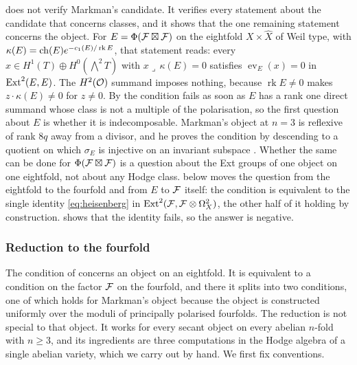 \begin{remark}\label{rem:onecondition}
 does not verify Markman's candidate. It verifies every
statement about the candidate that concerns classes, and it shows that the
one remaining statement concerns the object. For
$E=\Phi(\mathcal{F}\boxtimes\mathcal{F})$ on the eightfold $X\times\widehat X$ of Weil type,
with $\kappa(E)=\operatorname{ch}(E)e^{-c_{1}(E)/\operatorname{rk}E}$, that statement reads:
every $x\in H^{1}(T)\oplus H^{0}(\bigwedge^{2}T)$ with
$x\lrcorner\,\kappa(E)=0$ satisfies $\operatorname{ev}_{E}(x)=0$ in
$\operatorname{Ext}^{2}(E,E)$. The $H^{2}(\mathcal{O})$ summand imposes nothing, because
$\operatorname{rk}E\ne0$ makes $z\cdot\kappa(E)\ne0$ for $z\ne0$. By
\cite[Theorem~9.20]{paperI} the condition fails as soon as $E$ has a rank one
direct summand whose class is not a multiple of the polarisation, so the
first question about $E$ is whether it is indecomposable. Markman's object
at $n=3$ is reflexive of rank $8q$ away from a divisor, and he proves the
condition by descending to a quotient on which $\sigma_{E}$ is injective on
an invariant subspace \cite[Proposition 11.5]{Mar25b}. Whether the same can
be done for $\Phi(\mathcal{F}\boxtimes\mathcal{F})$ is a question about the Ext groups of one
object on one eightfold, not about any Hodge class.  below
moves the question from the eightfold to the fourfold and from $E$ to $\mathcal{F}$
itself: the condition is equivalent to the single identity
\eqref{eq:heisenberg} in $\operatorname{Ext}^{2}(\mathcal{F},\mathcal{F}\otimes\Omega^{2}_{X})$, the other
half of it holding by construction.  shows that the
identity fails, so the answer is negative.
\end{remark}

\subsubsection*{Reduction to the fourfold}

The condition of  concerns an object on an eightfold.
It is equivalent to a condition on the factor $\mathcal{F}$ on the fourfold, and
there it splits into two conditions, one of which holds for Markman's object
because the object is constructed uniformly over the moduli of principally
polarised fourfolds. The reduction is not special to that object. It works
for every secant object on every abelian $n$-fold with $n\ge3$, and its
ingredients are three computations in the Hodge algebra of a single abelian
variety, which we carry out by hand. We first fix
conventions.

